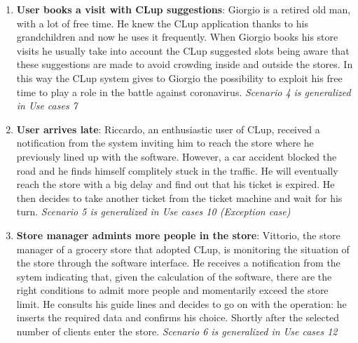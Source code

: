 \documentclass[]{article}
\begin{document}
\begin{enumerate}
	\item \textbf{User books a visit with CLup suggestions}: \newline
	Giorgio is a retired old man, with a lot of free time. He knew the CLup application thanks to his grandchildren and now he uses it frequently. When Giorgio books his store visits he usually take into account the CLup suggested slots being aware that these suggestions are made to avoid crowding inside and outside the stores. 
	\newline In this way the CLup system gives to Giorgio the possibility to exploit his free time to play a role in the battle against coronavirus. \newline
	\textit{Scenario 4 is generalized in Use cases 7} \newline
	
	\newpage
	\item \textbf{User arrives late}: \newline
	Riccardo, an enthusiastic user of CLup, received a notification from the system inviting him to reach the store where he previously lined up with the software. \newline
	However, a car accident blocked the road and he finds himself complitely stuck in the traffic. He will eventually reach the store with a big delay and find out that his ticket is expired. \newline He then decides to take another ticket from the ticket machine and wait for his turn. \newline
	\textit{Scenario 5 is generalized in Use cases 10 (Exception case)} \newline 
	
	\item \textbf{Store manager admints more people in the store}: \newline
	Vittorio, the store manager of a grocery store that adopted CLup, is monitoring the situation of the store through the software interface. \newline
	He receives a notification from the sytem indicating that, given the calculation of the software, there are the right conditions to admit more people and momentarily exceed the store limit. \newline
	He consults his guide lines and decides to go on with the operation: he inserts the required data and confirms his choice. \newline
	Shortly after the selected number of clients enter the store. \newline
	\textit{Scenario 6 is generalized in Use cases 12}
\end{enumerate}
\end{document}

